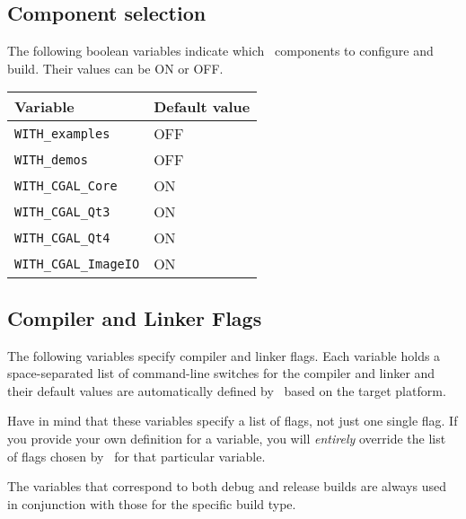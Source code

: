 \subsection{Component selection}

The following boolean variables indicate which \cgal\ components to configure and build. Their values can be ON or OFF.

{\ccTexHtml{\small}{}
\renewcommand{\arraystretch}{1.3}
\gdef\lcTabularBorder{2}
\begin{tabular}{|l|l|} \hline
  \textbf{Variable}            & \textbf{Default value}\\\hline\hline
  \texttt{WITH\_examples}      & OFF\\\hline
  \texttt{WITH\_demos}         & OFF\\\hline
  \texttt{WITH\_CGAL\_Core}    & ON\\\hline
  \texttt{WITH\_CGAL\_Qt3}     & ON\\\hline
  \texttt{WITH\_CGAL\_Qt4}     & ON\\\hline
  \texttt{WITH\_CGAL\_ImageIO} & ON\\\hline
\end{tabular}
}

\subsection{Compiler and Linker Flags}

The following variables specify compiler and linker flags. Each variable holds a 
space-separated list of command-line switches for the compiler and linker and 
their default values are automatically defined by \cmake\ based on the target platform.

Have in mind that these variables specify a list of flags, not just one
single flag. If you provide your own definition for a variable, you will \emph{entirely} override
the list of flags chosen by \cmake\ for that particular variable.

The variables that correspond to both debug and release builds are always
used in conjunction with those for the specific build type.

